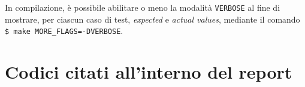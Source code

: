 \documentclass{article}
\newcommand{\terminal}[1]{\colorbox{tn-bg}{\textcolor{tn-fg}{\texttt{#1}}}}
\begin{document}
In compilazione, è possibile abilitare o meno la modalità \texttt{VERBOSE} al fine di mostrare, per ciascun caso di test, \textit{expected} e \textit{actual values}, mediante il comando \terminal{\$ make MORE\_FLAGS=-DVERBOSE}.

\appendix
\section{Codici citati all'interno del report}


\newpage

\end{document}
